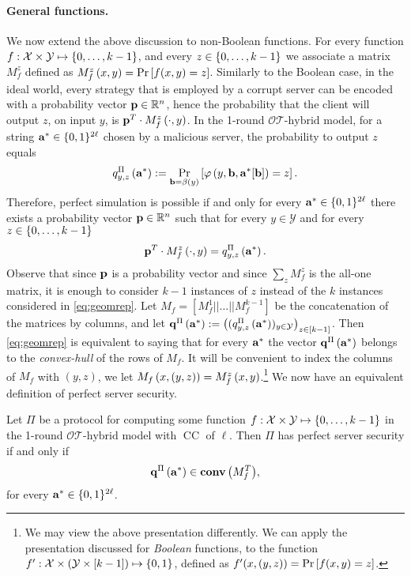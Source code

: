 \documentclass{llncs}
\newcommand{\OTfunc}{\mathcal{OT}}
\newcommand{\OThybrid}{\OTfunc\mbox{-}\text{hybrid}}
\newcommand{\X}{\mathcal{X}}
\newcommand{\Y}{\mathcal{Y}}
\renewcommand{\Z}{\set{0,\ldots,k-1}}
\newcommand{\CH}[1]{\normalfont{\mathbf{conv}\of{#1}}}
\newcommand{\p}{\myvec{p}}
\renewcommand{\q}{\myvec{q}}
\renewcommand{\b}{\myvec{b}}
\renewcommand{\a}{\myvec{a}}
\newcommand{\clnt}{\beta}
\newcommand{\local}{\varphi}
\newcommand{\CC}{\operatorname{CC}}
\begin{document}
\paragraph{General functions.}
We now extend the above discussion to non-Boolean functions. For every function $f:\X\times\Y\mapsto\Z$, and every $z\in\Z$ we associate a matrix $M_f^{z}$ defined as $M_f^z\left ( x,y \right )=\Pr\left[f(x,y)=z\right]$. Similarly to the Boolean case, in the ideal world, every strategy that is employed by a corrupt server can be encoded with a probability vector $\p\in\R^{n}$, hence the probability that the client will output $z$, on input $y$, is $\p^T\cdot M_f^z\of{\cdot,y}$. In the 1-round $\OThybrid$ model, for a string ${\bf a}^*\in\{0,1\}^{2\ell}$ chosen by a malicious server, the probability to output $z$ equals
$$q^{\Pi}_{y,z}\of{\a^*}:=\Pr_{\b=\clnt\of{y}}\left[\local\of{y,\b,\a^*[\b]}=z\right].$$ 
Therefore, perfect simulation is possible if and only for every $\a^*\in\zo^{2\ell}$ there exists a probability vector $\p\in\R^n$ such that for every $y\in\Y$ and for every $z\in\Z$
\begin{align}\label{eq:geomrep}
\p^T\cdot M^z_f\of{\cdot,y}=q^{\Pi}_{y,z}\of{\a^*}.
\end{align}
Observe that since $\p$ is a probability vector and since $\sum_z M_f^z$ is the all-one matrix, it is enough to consider $k-1$ instances of $z$ instead of the $k$ instances considered in \cref{eq:geomrep}. Let $M_f=\left[M_f^{1}||\ldots||M_f^{k-1}\right]$ be the concatenation of the matrices by columns, and let $\q^{\Pi}\of{\a^*}:=\left((q^{\Pi}_{y,z}\of{\a^*})_{y\in\Y}\right)_{z\in[k-1]}$. Then \cref{eq:geomrep} is equivalent to saying that for every $\a^*$ the vector $\q^{\Pi}\of{\a^*}$ belongs to the \emph{convex-hull} of the rows of $M_f$. It will be convenient to index the columns of $M_f$ with $(y,z)$, \ie we let $M_f\left ( x,(y,z) \right )=M_f^z\left ( x,y \right )$.\footnote{We may view the above presentation differently. We can apply the presentation discussed for \emph{Boolean} functions, to the function $f':\X\times\left(\Y\times[k-1]\right)\mapsto\zo$, defined as $f'(x,(y,z))=\Pr\left[f(x,y)=z\right]$.} We now have an equivalent definition of perfect server security.

\begin{lemma}\label{lem:srvrsec}
Let $\Pi$ be a protocol for computing some function $f:\X\times\Y\mapsto\Z$ in the 1-round $\OThybrid$ model with $\CC$ of $\ell$. Then $\Pi$ has perfect server security if and only if $$\q^{\Pi}\of{\a^*}\in\CH{M_f^T},$$
for every $\a^*\in\zo^{2\ell}$.
\end{lemma}
\end{document}
